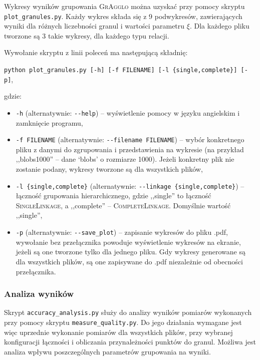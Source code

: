 \documentclass[a4paper,twoside,12pt]{book}
\newcommand{\dataset}[1]{`#1'}
\newcommand{\blobs}{\dataset{blobs}}
\newcommand{\procedura}[1]{\textsc{#1}}
\newcommand{\SingleLinkage}{\procedura{Si\-ng\-le\-Lin\-ka\-ge}}
\newcommand{\CompleteLinkage}{\procedura{Com\-ple\-te\-Lin\-ka\-ge}}
\newcommand{\MojAlg}{\procedura{GrAgglo}}
\begin{document}
\begin{appendices}
Wykresy wyników grupowania \MojAlg{} można uzyskać przy pomocy skryptu \lstinline|plot_granules.py|. Każdy wykres składa się z 9 podwykresów, zawierających wyniki dla różnych liczebności granul i wartości parametru $\xi$. Dla każdego pliku tworzone są 3 takie wykresy, dla każdego typu relacji.

Wywołanie skryptu z linii poleceń ma następującą składnię:

\lstinline|python plot_granules.py [-h] [-f FILENAME] [-l {single,complete}] [-p]|,

\noindent gdzie:

\begin{itemize}
	\item \lstinline|-h| (alternatywnie: \lstinline|--help|) -- wyświetlenie pomocy w języku angielskim i zamknięcie programu,
	\item \lstinline|-f FILENAME| (alternatywnie: \lstinline|--filename FILENAME|) -- wybór konkretnego pliku z danymi do zgrupowania i przedstawienia na wykresie (na przykład ,,blobs1000'' -- dane \blobs{} o rozmiarze 1000). Jeżeli konkretny plik nie zostanie podany, wykresy tworzone są dla wszystkich plików,
	\item \lstinline|-l {single,complete}| (alternatywnie: \lstinline|--linkage {single,complete}|) -- łączność grupowania hierarchicznego, gdzie ,,single'' to łączność \SingleLinkage{}, a ,,complete'' -- \CompleteLinkage{}. Domyślnie wartość ,,single'',
	\item \lstinline|-p| (alternatywnie: \lstinline|--save_plot|) -- zapisanie wykresów do pliku .pdf, wywołanie bez przełącznika powoduje wyświetlenie wykresów na ekranie, jeżeli są one tworzone tylko dla jednego pliku. Gdy wykresy generowane są dla wszystkich plików, są one zapisywane do .pdf niezależnie od obecności przełącznika.
\end{itemize}

\subsubsection*{Analiza wyników}

Skrypt \lstinline|accuracy_analysis.py| służy do analizy wyników pomiarów wykonanych przy pomocy skryptu \lstinline|measure_quality.py|. Do jego działania wymagane jest więc uprzednie wykonanie pomiarów dla wszystkich plików, przy wybranej konfiguracji łączności i obliczania przynależności punktów do granul. Możliwa jest analiza wpływu poszczególnych parametrów grupowania na wyniki.


\end{appendices}
\end{document}
